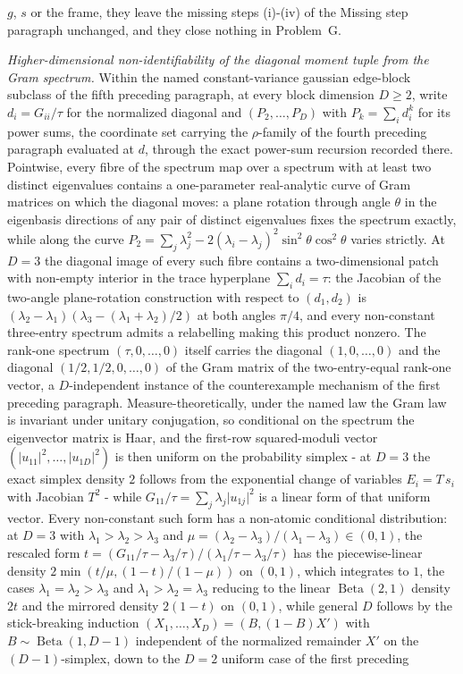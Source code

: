 \(g\), \(s\) or the frame, they leave the missing steps (i)-(iv) of the Missing step paragraph unchanged, and they close nothing in Problem~G.

\emph{Higher-dimensional non-identifiability of the diagonal moment tuple from the Gram spectrum.} Within the named constant-variance gaussian edge-block subclass of the fifth preceding paragraph, at every block dimension \(D\ge2\), write \(d_{i}=G_{ii}/\tau\) for the normalized diagonal and \((P_{2},\dots,P_{D})\) with \(P_{k}=\sum_{i}d_{i}^{k}\) for its power sums, the coordinate set carrying the \(\rho\)-family of the fourth preceding paragraph evaluated at \(d\), through the exact power-sum recursion recorded there. Pointwise, every fibre of the spectrum map over a spectrum with at least two distinct eigenvalues contains a one-parameter real-analytic curve of Gram matrices on which the diagonal moves: a plane rotation through angle \(\theta\) in the eigenbasis directions of any pair of distinct eigenvalues fixes the spectrum exactly, while along the curve \(P_{2}=\sum_{j}\lambda_{j}^{2}-2(\lambda_{i}-\lambda_{j})^{2}\sin^{2}\theta\cos^{2}\theta\) varies strictly. At \(D=3\) the diagonal image of every such fibre contains a two-dimensional patch with non-empty interior in the trace hyperplane \(\sum_{i}d_{i}=\tau\): the Jacobian of the two-angle plane-rotation construction with respect to \((d_{1},d_{2})\) is \((\lambda_{2}-\lambda_{1})(\lambda_{3}-(\lambda_{1}+\lambda_{2})/2)\) at both angles \(\pi/4\), and every non-constant three-entry spectrum admits a relabelling making this product nonzero. The rank-one spectrum \((\tau,0,\dots,0)\) itself carries the diagonal \((1,0,\dots,0)\) and the diagonal \((1/2,1/2,0,\dots,0)\) of the Gram matrix of the two-entry-equal rank-one vector, a \(D\)-independent instance of the counterexample mechanism of the first preceding paragraph. Measure-theoretically, under the named law the Gram law is invariant under unitary conjugation, so conditional on the spectrum the eigenvector matrix is Haar, and the first-row squared-moduli vector \((\lvert u_{11}\rvert^{2},\dots,\lvert u_{1D}\rvert^{2})\) is then uniform on the probability simplex - at \(D=3\) the exact simplex density \(2\) follows from the exponential change of variables \(E_{i}=T\,s_{i}\) with Jacobian \(T^{2}\) - while \(G_{11}/\tau=\sum_{j}\lambda_{j}\lvert u_{1j}\rvert^{2}\) is a linear form of that uniform vector. Every non-constant such form has a non-atomic conditional distribution: at \(D=3\) with \(\lambda_{1}>\lambda_{2}>\lambda_{3}\) and \(\mu=(\lambda_{2}-\lambda_{3})/(\lambda_{1}-\lambda_{3})\in(0,1)\), the rescaled form \(t=(G_{11}/\tau-\lambda_{3}/\tau)/(\lambda_{1}/\tau-\lambda_{3}/\tau)\) has the piecewise-linear density \(2\min(t/\mu,(1-t)/(1-\mu))\) on \((0,1)\), which integrates to \(1\), the cases \(\lambda_{1}=\lambda_{2}>\lambda_{3}\) and \(\lambda_{1}>\lambda_{2}=\lambda_{3}\) reducing to the linear \(\operatorname{Beta}(2,1)\) density \(2t\) and the mirrored density \(2(1-t)\) on \((0,1)\), while general \(D\) follows by the stick-breaking induction \((X_{1},\dots,X_{D})=(B,(1-B)X')\) with \(B\sim\operatorname{Beta}(1,D-1)\) independent of the normalized remainder \(X'\) on the \((D-1)\)-simplex, down to the \(D=2\) uniform case of the first preceding 